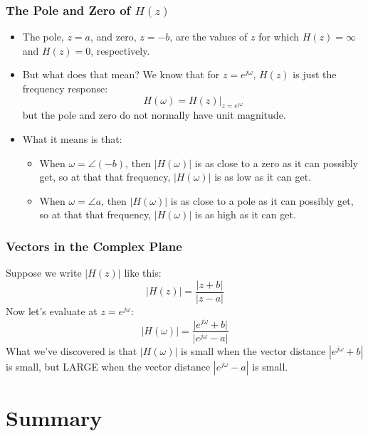 \documentclass{beamer}
\begin{document}
\begin{frame}
  \frametitle{The Pole and Zero of $H(z)$}

  \begin{itemize}
  \item The pole, $z=a$, and zero, $z=-b$, are the values of $z$ for which
    $H(z)=\infty$  and $H(z)=0$, respectively.
  \item But what does that mean?  We know that for $z=e^{j\omega}$,
    $H(z)$ is just the frequency response:
    \[
    H(\omega) = H(z)\vert_{z=e^{j\omega}}
    \]
    but the pole and zero do not normally have unit magnitude.
  \item What it means is that:
    \begin{itemize}
      \item When $\omega=\angle (-b)$, then
        $|H(\omega)|$ is as close to a zero as it can possibly get, so at that 
        that frequency, $|H(\omega)|$ is as low as it can get.
      \item When $\omega=\angle a$, then
        $|H(\omega)|$ is as close to a pole as it can possibly get, so at that 
        that frequency, $|H(\omega)|$ is as high as it can get.
    \end{itemize}
  \end{itemize}
\end{frame}

\begin{frame}
  \centerline{}
\end{frame}

\begin{frame}
  \centerline{}
\end{frame}

\begin{frame}
  \frametitle{Vectors in the Complex Plane}

  Suppose we write $|H(z)|$ like this:
  \[
  \vert H(z)\vert = \frac{\vert z+b\vert}{\vert z-a\vert}
  \]
  Now let's evaluate at $z=e^{j\omega}$:
  \[
  \vert H(\omega)\vert = 
  \frac{\vert e^{j\omega}+b\vert}{\vert e^{j\omega}-a\vert}
  \]
  What we've discovered is that $|H(\omega)|$ is small when the vector
  distance $|e^{j\omega}+b|$ is small, but LARGE when the vector
  distance $|e^{j\omega}-a|$ is small.
\end{frame}

\section[Summary]{Summary}
\setcounter{subsection}{1}
\end{document}
